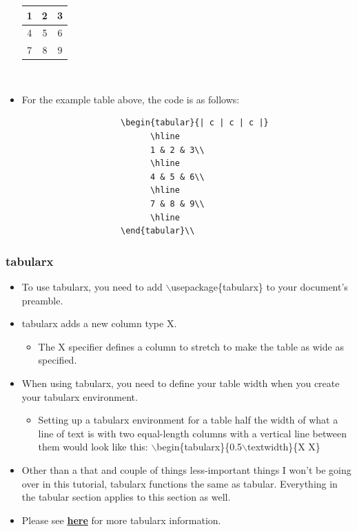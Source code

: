 \begin{itemize}
				\begin{tabular}{| c | c | c |}
					\hline
					1 & 2 & 3\\
					\hline
					4 & 5 & 6\\
					\hline
					7 & 8 & 9\\
					\hline
				\end{tabular}\\
				\item For the example table above, the code is as follows:
				\begin{verbatim}
					\begin{tabular}{| c | c | c |}
					      \hline
					      1 & 2 & 3\\
					      \hline
					      4 & 5 & 6\\
					      \hline
					      7 & 8 & 9\\
					      \hline
					\end{tabular}\\
				\end{verbatim}
			\end{itemize}
		
		\subsubsection{tabularx}
			\begin{itemize}
				\item To use tabularx, you need to add $\backslash$usepackage\{tabularx\} to your document's preamble.
				\item tabularx adds a new column type X.
				\begin{itemize}
					\item The X specifier defines a column to stretch to make the table as wide as specified.
				\end{itemize}
				\item When using tabularx, you need to define your table width when you create your tabularx environment.
				\begin{itemize}
					\item Setting up a tabularx environment for a table half the width of what a line of text is with two equal-length columns with a vertical line between them would look like this: $\backslash$begin\{tabularx\}\{0.5$\backslash$textwidth\}\{X \textbar{} X\}
				\end{itemize}
				\item Other than a that and couple of things less-important things I won\rq{}t be going over in this tutorial, tabularx functions the same as tabular. Everything in the tabular section applies to this section as well.
				\item Please see \href{https://en.wikibooks.org/wiki/LaTeX/Tables#The_tabularx_package}{\textbf{here}} for more tabularx information.
			\end{itemize}


